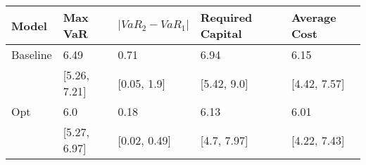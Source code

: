 \begin{tabular}{lllll}
\toprule
   Model &      Max VaR & $|VaR_2 - VaR_1|$ & Required Capital & Average Cost \\
\midrule
Baseline &         6.49 &              0.71 &             6.94 &         6.15 \\
         & [5.26, 7.21] &       [0.05, 1.9] &      [5.42, 9.0] & [4.42, 7.57] \\
     Opt &          6.0 &              0.18 &             6.13 &         6.01 \\
         & [5.27, 6.97] &      [0.02, 0.49] &      [4.7, 7.97] & [4.22, 7.43] \\
\bottomrule
\end{tabular}
